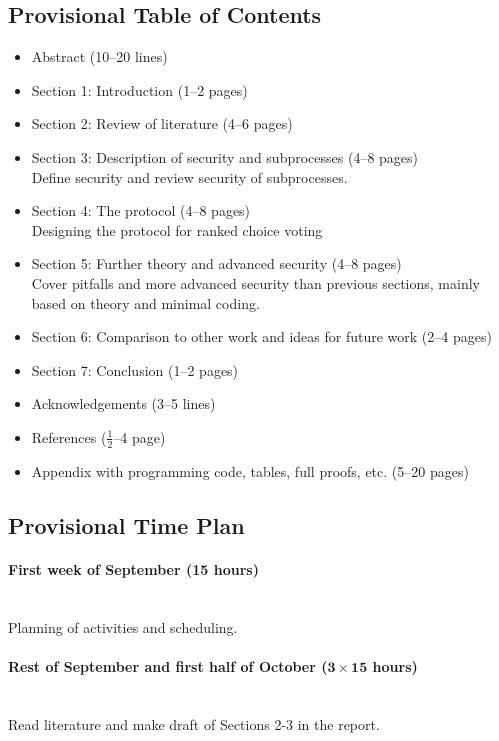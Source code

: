 \documentclass{article}
\newcommand{\timeest}[1]{$\mathbf{#1}$}%
\begin{document}
\subsection*{Provisional Table of Contents}
\begin{itemize}
    \item Abstract (10--20 lines)
    \item Section 1: Introduction (1--2 pages)
    \item Section 2: Review of literature (4--6 pages)
    \item Section 3: Description of security and subprocesses (4--8 pages) \\
    Define security and review security of subprocesses.
    \item Section 4: The protocol (4--8 pages) \\
    Designing the protocol for ranked choice voting 
    \item Section 5: Further theory and advanced security (4--8 pages) \\
    Cover pitfalls and more advanced security than previous sections, mainly based on theory and minimal coding.
    \item Section 6: Comparison to other work and ideas for future work (2--4 pages)
    \item Section 7: Conclusion (1--2 pages)
    \item Acknowledgements (3--5 lines)
    \item References ($\frac{1}{2}$--4 page)
    \item Appendix with programming code, tables, full proofs, etc. (5--20 pages)
\end{itemize}

\newpage
\subsection*{Provisional Time Plan}

\paragraph{First week of September (15 hours)}~\\\noindent
Planning of activities and scheduling.

\paragraph{Rest of September and first half of October (\timeest{3\times 15} hours)}~\\\noindent
Read literature and make draft of Sections 2-3 in the report.
\end{document}
